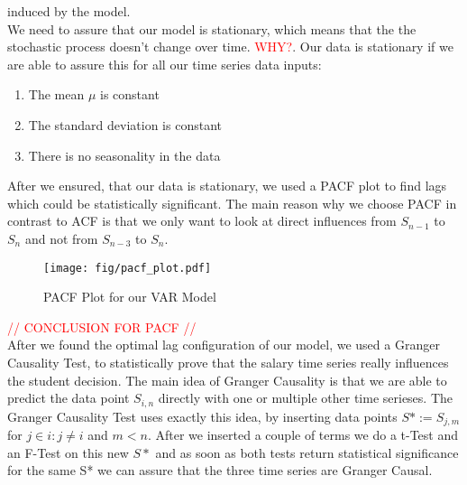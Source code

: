 \documentclass{article}
\theoremstyle{plain}
\theoremstyle{definition}
\theoremstyle{remark}
\begin{document}
induced by the model.\\
We need to assure that our model is stationary, which means that the the stochastic process doesn't change over time. \textcolor{red}{WHY?}.
Our data is stationary if we are able to assure this for all our time series data inputs:
\begin{enumerate}[label=\Roman*]
    \item The mean $\mu$ is constant
    \item The standard deviation is constant
    \item There is no seasonality in the data
\end{enumerate}

After we ensured, that our data is stationary, we used a PACF plot to find lags which could be statistically significant. 
The main reason why we choose PACF in contrast to ACF is that we only want to look at direct influences from $S_{n-1}$ to $S_{n}$ and not from $S_{n-3}$ to $S_n$.
\begin{figure}
    \texttt{[image: fig/pacf\_plot.pdf]}
    \caption{PACF Plot for our VAR Model}
\end{figure}
\textcolor{red}{// CONCLUSION FOR PACF // }\\

After we found the optimal lag configuration of our model, we used a Granger Causality Test, to statistically prove that the salary time series really influences the student decision.
The main idea of Granger Causality is that we are able to predict the data point $S_{i,n}$ directly with one or multiple other time serieses. The Granger Causality Test uses exactly this
idea, by inserting data points $S*:=S_{j,m}$ for $j\in i:j\neq i$  and $m<n$. After we inserted a couple of terms we do a t-Test and an F-Test on this new $S*$ and as soon as both tests
return statistical significance for the same S* we can assure that the three time series are Granger Causal.






% 
\end{document}
